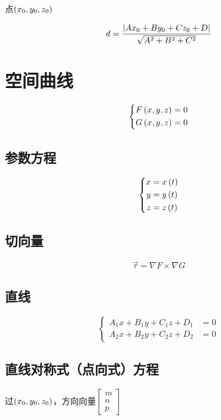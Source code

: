\documentclass{article}
\begin{document}
点$\left(x_0,y_0,z_0\right)$

\[d=\frac{\left|Ax_0+By_0+Cz_0+D\right|}{\sqrt{A^2+B^2+C^2}}\]

\section{空间曲线}

\begin{definition}[]
    \[\left\{\begin{aligned}
            F\left(x,y,z\right) & =0 \\
            G\left(x,y,z\right) & =0
        \end{aligned}\right.\]
\end{definition}

\subsection{参数方程}

\[\left\{\begin{aligned}
        x & =x\left(t\right) \\
        y & =y\left(t\right) \\
        z & =z\left(t\right)
    \end{aligned}\right.\]

\subsection{切向量}

\[\vec\tau=\nabla F\times\nabla G\]

\subsection{直线}

\begin{definition}[]
    \[\left\{\begin{aligned}
            A_1x+B_1y+C_1z+D_1 & =0 \\
            A_2x+B_2y+C_2z+D_2 & =0
        \end{aligned}\right.\]
\end{definition}

\subsection{直线对称式（点向式）方程}

过$\left(x_0,y_0,z_0\right)$，方向向量$\begin{bmatrix}m\\n\\p\end{bmatrix}$
\end{document}
